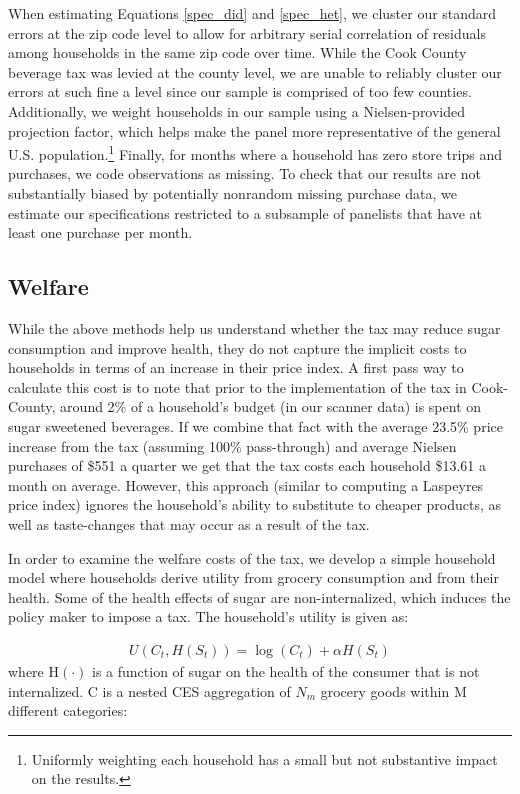 \documentclass[12pt]{article}
\begin{document}
When estimating Equations \ref{spec_did} and \ref{spec_het}, we cluster our standard errors at the zip code level to allow for arbitrary serial correlation of residuals among households in the same zip code over time. While the Cook County beverage tax was levied at the county level, we are unable to reliably cluster our errors at such fine a level since our sample is comprised of too few counties. Additionally, we weight households in our sample using a Nielsen-provided projection factor, which helps make the panel more representative of the general U.S. population.\footnote{Uniformly weighting each household has a small but not substantive impact on the results.} Finally, for months where a household has zero store trips and purchases, we code observations as missing. To check that our results are not substantially biased by potentially nonrandom missing purchase data, we estimate our specifications restricted to a subsample of panelists that have at least one purchase per month.

\subsection{Welfare}

While the above methods help us understand whether the tax may reduce sugar consumption and improve health, they do not capture the implicit costs to households in terms of an increase in their price index. A first pass way to calculate this cost is to note that prior to the implementation of the tax in Cook-County, around 2\% of a household's budget (in our scanner data) is spent on sugar sweetened beverages. If we combine that fact with the average 23.5\% price increase from the tax (assuming 100\% pass-through) and average Nielsen purchases of \$551 a quarter we get that the tax costs each household \$13.61 a month on average. However, this approach (similar to computing a Laspeyres price index) ignores the household's ability to substitute to cheaper products, as well as taste-changes that may occur as a result of the tax.

In order to examine the welfare costs of the tax, we develop a simple household model where households derive utility from grocery consumption and from their health. Some of the health effects of sugar are non-internalized, which induces the policy maker to impose a tax. The household's utility is given as:

\begin{align}
	U(C_t,H(S_t)) = \log(C_t) + \alpha H(S_t)
\end{align}
where H$(\cdot)$ is a function of sugar on the health of the consumer that is not internalized. C is a nested CES aggregation of $N_m$ grocery goods within M different categories:
\end{document}
